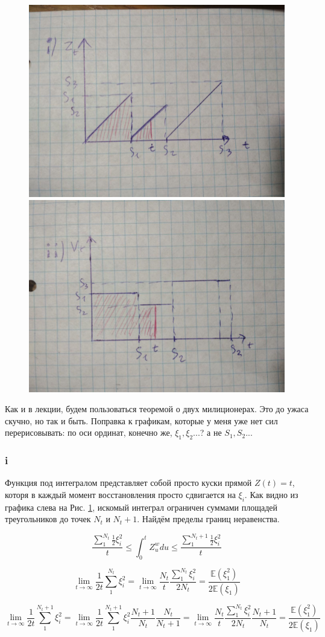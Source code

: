 \documentclass[a4paper,12pt]{article}
\def \mbb{\mathbb}
\def \E{\mbb{E}}
\begin{document}
\begin{figure}[h]
	
	\includegraphics[width = 0.5\linewidth]{21}
	\includegraphics[width = 0.5\linewidth]{22}
	\label{police}
\end{figure}

Как и в лекции, будем пользоваться теоремой о двух милиционерах. Это до ужаса скучно, но так и быть. Поправка к графикам, которые у меня уже нет сил перерисовывать: по оси ординат, конечно же, $ \xi_1, \xi_2 ... $? а не $ S_1, S_2 ... $

\subsubsection{i}

Функция под интегралом представляет собой просто куски прямой $ Z(t) = t $, которя в каждый момент восстановления просто сдвигается на $ \xi_i $.
Как видно из графика слева на Рис. \ref{police}, искомый интеграл ограничен суммами площадей треугольников до точек $ N_t $ и $ N_t+1 $. Найдём пределы границ неравенства.

\[ \frac{\sum_{1}^{N_t}\frac{1}{2}\xi_i^2}{t} \le \int_{0}^{t}Z_u^{w} du\le \frac{\sum_{1}^{N_t + 1}\frac{1}{2}\xi_i^2}{t} \]

\[ \lim\limits_{t \to \infty}\frac{1}{2t} \sum_{1}^{N_t}\xi_i^2 = \lim\limits_{t \to \infty} \frac{N_t}{t}  \frac{\sum_{1}^{N_t}\xi_i^2 }{2 N_t} = \frac{\E(\xi_1^2)}{2 \E(\xi_1)} \]


\[ \lim\limits_{t \to \infty}\frac{1}{2t} \sum_{1}^{N_t + 1}\xi_i^2 = \lim\limits_{t \to \infty}\frac{1}{2t} \sum_{1}^{N_t + 1}\xi_i^2 \frac{N_t + 1}{N_t}  \frac{N_t}{N_t+1}= 
\lim\limits_{t \to \infty} \frac{N_t}{t}  \frac{\sum_{1}^{N_t}\xi_i^2 }{2 N_t} \frac{N_t + 1}{N_t} = \frac{\E(\xi_1^2)}{2 \E(\xi_1)} \]
\end{document}
